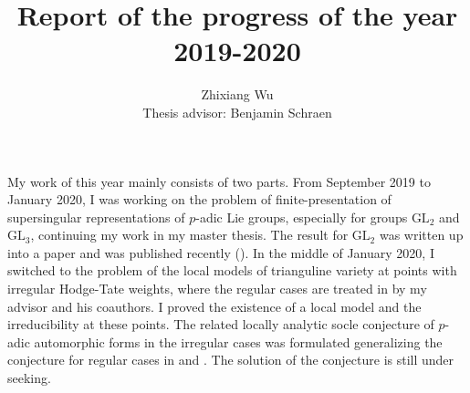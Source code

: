 \documentclass{amsart}
\title{Report of the progress of the year 2019-2020}
\author{Zhixiang Wu\\ Thesis advisor: Benjamin Schraen}
\date{}
\newcommand{\GL}{\text{GL}}
\numberwithin{equation}{section}
\begin{document}
\maketitle
My work of this year mainly consists of two parts. From September 2019 to January 2020, I was working on the problem of finite-presentation of supersingular representations of $p$-adic Lie groups, especially for groups $\GL_2$ and $\GL_3$, continuing my work in my master thesis. The result for $\GL_2$ was written up into a paper and was published recently (\cite{wu2020supersingular}). In the middle of January 2020, I switched to the problem of the local models of trianguline variety at points with irregular Hodge-Tate weights, where the regular cases are treated in \cite{breuil2019local} by my advisor and his coauthors. I proved the existence of a local model and the irreducibility at these points. The related locally analytic socle conjecture of $p$-adic automorphic forms in the irregular cases was formulated generalizing the conjecture for regular cases in \cite{breuil2016versI} and \cite{breuil2015versII}. The solution of the conjecture is still under seeking.
\end{document}
